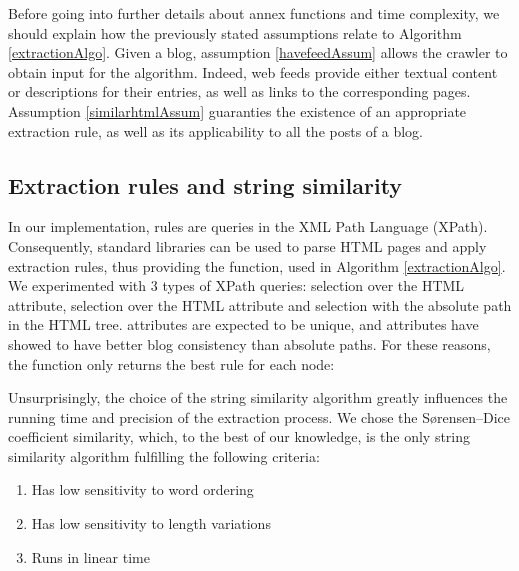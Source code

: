 Before going into further details about annex functions and time complexity, we should explain how the previously stated assumptions relate to Algorithm \ref{extractionAlgo}. Given a blog, assumption \ref{havefeedAssum} allows the crawler to obtain input for the algorithm. Indeed, web feeds provide either textual content or descriptions for their entries, as well as links to the corresponding pages. Assumption \ref{similarhtmlAssum} guaranties the existence of an appropriate extraction rule, as well as its applicability to all the posts of a blog.

\subsection{Extraction rules and string similarity}
In our implementation, rules are queries in the XML Path Language (XPath). Consequently, standard libraries can be used to parse HTML pages and apply extraction rules, thus providing the  function, used in Algorithm \ref{extractionAlgo}. We experimented with 3 types of XPath queries: selection over the HTML  attribute, selection over the HTML  attribute and selection with the absolute path in the HTML tree.  attributes are expected to be unique, and  attributes have showed to have better blog consistency than absolute paths. For these reasons, the  function only returns the best rule for each node:

\allrulesAlgo

Unsurprisingly, the choice of the string similarity algorithm greatly influences the running time and precision of the extraction process. We chose the Sørensen–Dice coefficient similarity\cite{dice1945}, which, to the best of our knowledge, is the only string similarity algorithm fulfilling the following criteria:

\begin{enumerate}
  \item\label{wordorderProp} Has low sensitivity to word ordering
  \item\label{lengthProp} Has low sensitivity to length variations
  \item\label{linearProp} Runs in linear time
\end{enumerate}

